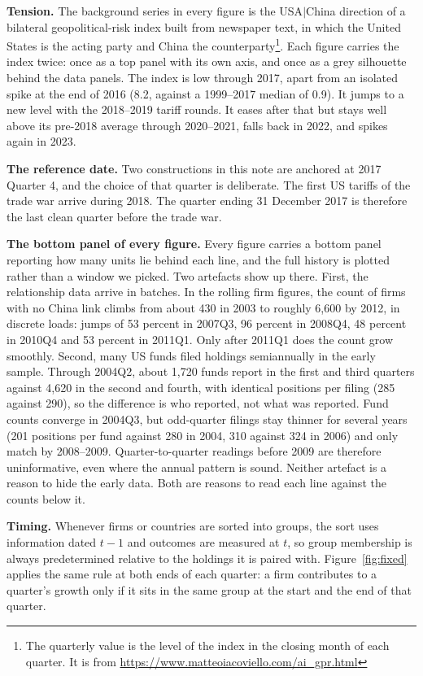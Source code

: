 \documentclass[11pt]{article}
\begin{document}
\textbf{Tension.} The background series in every figure is the USA$|$China
direction of a bilateral geopolitical-risk index built from newspaper text, in
which the United States is the acting party and China the counterparty\footnote{The quarterly value is the level of
the index in the closing month of each quarter. It is from \url{https://www.matteoiacoviello.com/ai_gpr.html}}. Each figure carries the index
twice: once as a top panel with its own axis, and once as a grey silhouette
behind the data panels. The index is low through 2017, apart from an
isolated spike at the end of 2016 (8.2, against a 1999--2017 median of 0.9). It
jumps to a new level with the 2018--2019 tariff rounds. It eases after that but
stays well above its pre-2018 average through 2020--2021, falls back in 2022, and spikes again in 2023.

\textbf{The reference date.} Two constructions in this note are
anchored at 2017 Quarter 4, and the choice of that quarter is deliberate. The first US tariffs of the trade war arrive during 2018. The quarter ending 31 December 2017 is therefore the last clean quarter before the trade war.

\textbf{The bottom panel of every figure.} Every figure carries a bottom panel
reporting how many units lie behind each line, and the full history is
plotted rather than a window we picked. Two artefacts show up there. First,
the relationship data arrive in batches. In the rolling firm figures, the
count of firms with no China link climbs from about 430 in 2003 to roughly
6,600 by 2012, in discrete loads: jumps of 53 percent in 2007Q3, 96 percent in
2008Q4, 48 percent in 2010Q4 and 53 percent in 2011Q1. Only after 2011Q1 does
the count grow smoothly. Second, many US funds filed holdings semiannually in
the early sample. Through 2004Q2, about 1,720 funds report in the first and
third quarters against 4,620 in the second and fourth, with identical
positions per filing (285 against 290), so the difference is who reported, not
what was reported. Fund counts converge in 2004Q3, but odd-quarter filings
stay thinner for several years (201 positions per fund against 280 in 2004,
310 against 324 in 2006) and only match by 2008--2009. Quarter-to-quarter
readings before 2009 are therefore uninformative, even where the annual
pattern is sound. Neither artefact is a reason to hide the early data. Both
are reasons to read each line against the counts below it.

\textbf{Timing.} Whenever firms or countries are sorted into groups, the sort
uses information dated $t-1$ and outcomes are measured at $t$, so group
membership is always predetermined relative to the holdings it is paired
with. Figure~\ref{fig:fixed} applies the same rule at both ends of each
quarter: a firm contributes to a quarter's growth only if it sits in the same
group at the start and the end of that quarter.
\end{document}
